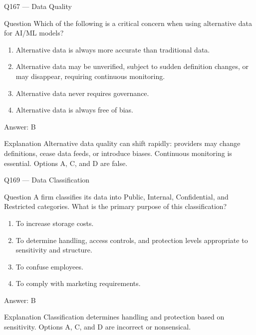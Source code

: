 \documentclass[aspectratio=169,8pt]{beamer}
\begin{document}
\begin{frame}{Q167 --- Data Quality}
\begin{block}{Question}
Which of the following is a critical concern when using alternative data for AI/ML models?
\begin{enumerate}
\item Alternative data is always more accurate than traditional data.
\item Alternative data may be unverified, subject to sudden definition changes, or may disappear, requiring continuous monitoring.
\item Alternative data never requires governance.
\item Alternative data is always free of bias.
\end{enumerate}  \end{block}
\begin{exampleblock}{Answer: B}\end{exampleblock}
\begin{block}{Explanation}
Alternative data quality can shift rapidly: providers may change definitions, cease data feeds, or introduce biases. Continuous monitoring is essential. Options A, C, and D are false.
\end{block}
\end{frame}


\begin{frame}{Q169 --- Data Classification}
\begin{block}{Question}
A firm classifies its data into Public, Internal, Confidential, and Restricted categories. What is the primary purpose of this classification?
\begin{enumerate}
\item To increase storage costs.
\item To determine handling, access controls, and protection levels appropriate to sensitivity and structure.
\item To confuse employees.
\item To comply with marketing requirements.
\end{enumerate}  \end{block}
\begin{exampleblock}{Answer: B}\end{exampleblock}
\begin{block}{Explanation}
Classification determines handling and protection based on sensitivity. Options A, C, and D are incorrect or nonsensical.
\end{block}
\end{frame}
\end{document}
